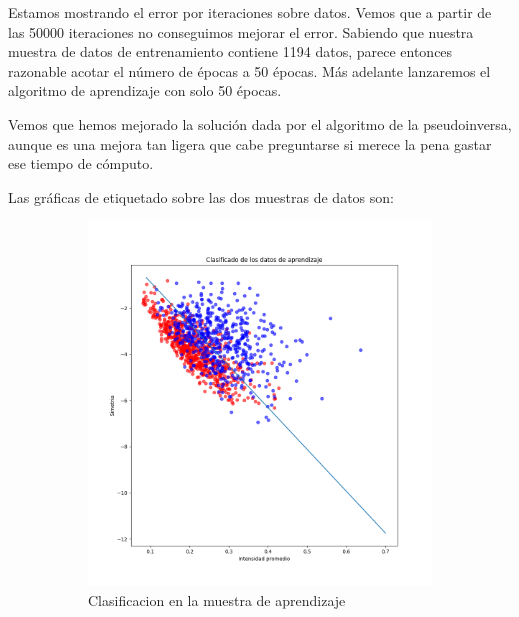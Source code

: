 \documentclass[11pt]{article}
\begin{document}
Estamos mostrando el error por iteraciones sobre datos. Vemos que a partir de las 50000 iteraciones no conseguimos mejorar el error. Sabiendo que nuestra muestra de datos de entrenamiento contiene 1194 datos, parece entonces razonable acotar el número de épocas a 50 épocas. Más adelante lanzaremos el algoritmo de aprendizaje con solo 50 épocas.

Vemos que hemos mejorado la solución dada por el algoritmo de la pseudoinversa, aunque es una mejora tan ligera que cabe preguntarse si merece la pena gastar ese tiempo de cómputo.

Las gráficas de etiquetado sobre las dos muestras de datos son:

\begin{figure}[H]
    \centering
    \begin{subfigure}{0.3\textwidth}
        \includegraphics[scale=0.30]{clasificacion_pocket_learning}
        \caption{Clasificacion en la muestra de aprendizaje}
    \end{subfigure} \hspace{0.2\textwidth}
    \begin{subfigure}{0.3\textwidth}

\end{subfigure}
\end{figure}
\end{document}
